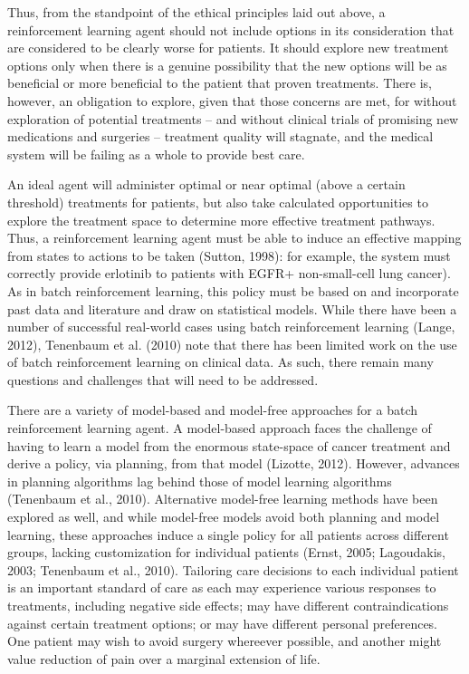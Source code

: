 \documentclass[]{spie}  %
\begin{document}
Thus, from the standpoint of the ethical principles laid out above, a reinforcement learning agent should not include options in its consideration that are considered to be clearly worse for patients. It should explore new treatment options only when there is a genuine possibility that the new options will be as beneficial or more beneficial to the patient that proven treatments. There is, however, an obligation to explore, given that those concerns are met, for without exploration of potential treatments -- and without clinical trials of promising new medications and surgeries -- treatment quality will stagnate, and the medical system will be failing as a whole to provide best care.

An ideal agent will administer optimal or near optimal (above a certain threshold) treatments for patients, but also take calculated opportunities to explore the treatment space to determine more effective treatment pathways. Thus, a reinforcement learning agent must be able to induce an effective mapping from states to actions to be taken (Sutton, 1998): for example, the system must correctly provide erlotinib to patients with EGFR+ non-small-cell lung cancer). As in batch reinforcement learning, this policy must be based on and incorporate past data and literature and draw on statistical models. While there have been a number of successful real-world cases using batch reinforcement learning (Lange, 2012), Tenenbaum et al. (2010) note that there has been limited work on the use of batch reinforcement learning on clinical data. As such, there remain many questions and challenges that will need to be addressed.

There are a variety of model-based and model-free approaches for a batch reinforcement learning agent. A model-based approach faces the challenge of having to learn a model from the enormous state-space of cancer treatment and derive a policy, via planning, from that model (Lizotte, 2012). However, advances in planning algorithms lag behind those of model learning algorithms (Tenenbaum et al., 2010). Alternative model-free learning methods have been explored as well, and while model-free models avoid both planning and model learning, these approaches induce a single policy for all patients across different groups, lacking customization for individual patients (Ernst, 2005; Lagoudakis, 2003; Tenenbaum et al., 2010). Tailoring care decisions to each individual patient is an important standard of care as each may experience various responses to treatments, including negative side effects; may have different contraindications against certain treatment options; or may have different personal preferences. One patient may wish to avoid surgery whereever possible, and another might value reduction of pain over a marginal extension of life.
\end{document}
